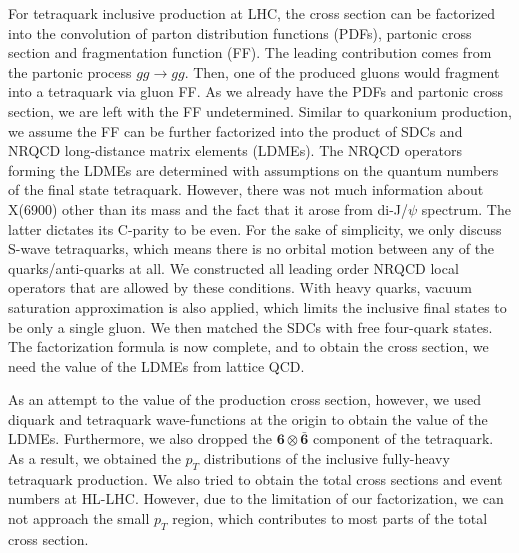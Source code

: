 \documentclass[letterpaper,11pt]{article}
\begin{document}
    For tetraquark inclusive production at LHC, the cross section can be factorized into the convolution of parton distribution functions (PDFs), partonic cross section and fragmentation function (FF). The leading contribution comes from the partonic process $gg\to gg$. Then, one of the produced gluons would fragment into a tetraquark via gluon FF. As we already have the PDFs and partonic cross section, we are left with the FF undetermined. 
    Similar to quarkonium production, we assume the FF can be further factorized into the product of SDCs and NRQCD long-distance matrix elements (LDMEs). The NRQCD operators forming the LDMEs are determined with assumptions on the quantum numbers of the final state tetraquark. However, there was not much information about X(6900) other than its mass and the fact that it arose from di-J/$\psi$ spectrum. The latter dictates its C-parity to be even. For the sake of simplicity, we only discuss S-wave tetraquarks, which means there is no orbital motion between any of the quarks/anti-quarks at all. We constructed all leading order NRQCD local operators that are allowed by these conditions. With heavy quarks, vacuum saturation approximation is also applied, which limits the inclusive final states to be only a single gluon. We then matched the SDCs with free four-quark states. The factorization formula is now complete, and to obtain the cross section, we need the value of the LDMEs from lattice QCD. 

    As an attempt to the value of the production cross section, however, we used diquark and tetraquark wave-functions at the origin to obtain the value of the LDMEs. Furthermore, we also dropped the $\mathbf{6}\otimes \mathbf{\bar 6}$ component of the tetraquark. As a result, we obtained the $p_T$ distributions of the inclusive fully-heavy tetraquark production. We also tried to obtain the total cross sections and event numbers at {HL-LHC}. However, due to the limitation of our factorization, we can not approach the small $p_T$ region, which contributes to most parts of the total cross section. 
\end{document}
